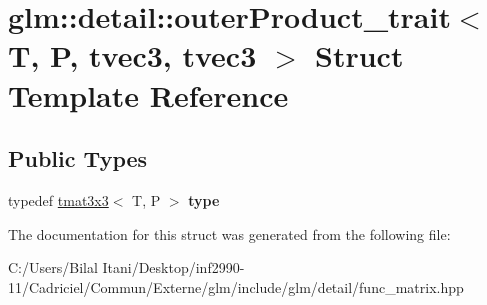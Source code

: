 \hypertarget{structglm_1_1detail_1_1outer_product__trait_3_01_t_00_01_p_00_01tvec3_00_01tvec3_01_4}{}\section{glm\+:\+:detail\+:\+:outer\+Product\+\_\+trait$<$ T, P, tvec3, tvec3 $>$ Struct Template Reference}
\label{structglm_1_1detail_1_1outer_product__trait_3_01_t_00_01_p_00_01tvec3_00_01tvec3_01_4}
\subsection*{Public Types}
\begin{DoxyCompactItemize}
\item 
typedef \hyperlink{structglm_1_1detail_1_1tmat3x3}{tmat3x3}$<$ T, P $>$ {\bfseries type}\hypertarget{structglm_1_1detail_1_1outer_product__trait_3_01_t_00_01_p_00_01tvec3_00_01tvec3_01_4_ac6a4ba81935840a9b4e4603f0bc0e222}{}\label{structglm_1_1detail_1_1outer_product__trait_3_01_t_00_01_p_00_01tvec3_00_01tvec3_01_4_ac6a4ba81935840a9b4e4603f0bc0e222}

\end{DoxyCompactItemize}


The documentation for this struct was generated from the following file\+:\begin{DoxyCompactItemize}
\item 
C\+:/\+Users/\+Bilal Itani/\+Desktop/inf2990-\/11/\+Cadriciel/\+Commun/\+Externe/glm/include/glm/detail/func\+\_\+matrix.\+hpp\end{DoxyCompactItemize}
